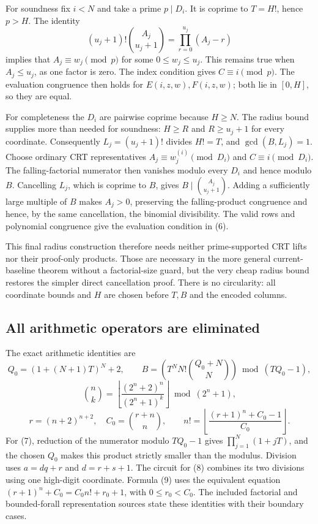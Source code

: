 For soundness fix $i<N$ and take a prime $p\mid D_i$.  It is coprime to
$T=H!$, hence $p>H$.  The identity
\[
 (u_j+1)!{A_j\choose u_j+1}=\prod_{r=0}^{u_j}(A_j-r)
\]
implies that $A_j\equiv w_j\pmod p$ for some $0\le w_j\le u_j$.
This remains true when $A_j\le u_j$, as one factor is zero.  The index
condition gives $C\equiv i\pmod p$.  The evaluation congruence then holds
for $E(i,z,w),F(i,z,w)$; both lie in $[0,H]$, so they are equal.

For completeness the $D_i$ are pairwise coprime because $H\ge N$.
The radius bound supplies more than needed for soundness: $H\ge R$ and
$R\ge u_j+1$ for every coordinate.  Consequently
$L_j=(u_j+1)!$ divides $H!=T$, and $\gcd(B,L_j)=1$.
Choose ordinary CRT representatives
$A_j\equiv w_j^{(i)}\pmod{D_i}$ and $C\equiv i\pmod{D_i}$.
The falling-factorial numerator then vanishes modulo every $D_i$ and
hence modulo $B$.  Cancelling $L_j$, which is coprime to $B$, gives
$B\mid {A_j\choose u_j+1}$.  Adding a sufficiently large multiple of
$B$ makes $A_j>0$, preserving the falling-product congruence and hence,
by the same cancellation, the binomial divisibility.  The valid rows
and polynomial congruence give the evaluation condition in (6).

This final radius construction therefore needs neither prime-supported
CRT lifts nor their proof-only products.  Those are necessary in the more
general current-baseline theorem without a factorial-size guard, but the
very cheap radius bound restores the simpler direct cancellation proof.
There is no circularity: all coordinate bounds and $H$ are chosen before
$T,B$ and the encoded columns.

\subsection{All arithmetic operators are eliminated}

The exact arithmetic identities are
\[
 Q_0=(1+(N+1)T)^N+2,\qquad
 B=\left(T^N N!{Q_0+N\choose N}\right)\bmod(TQ_0-1), \tag{7}
\]
\[
 {n\choose k}=
 \left\lfloor\frac{(2^n+2)^n}{(2^n+1)^k}\right\rfloor\bmod(2^n+1), \tag{8}
\]
\[
 r=(n+2)^{n+2},\quad C_0={r+n\choose n},\qquad
 n!=\left\lfloor\frac{(r+1)^n+C_0-1}{C_0}\right\rfloor. \tag{9}
\]
For (7), reduction of the numerator modulo $TQ_0-1$ gives
$\prod_{j=1}^N(1+jT)$, and the chosen $Q_0$ makes this product strictly
smaller than the modulus.  Division uses $a=dq+r$ and $d=r+s+1$.
The circuit for (8) combines its two divisions using one high-digit
coordinate.  Formula (9) uses the equivalent equation
$(r+1)^n+C_0=C_0 n!+r_0+1$, with $0\le r_0<C_0$.
The included factorial and bounded-forall representation sources state
these identities with their boundary cases.

